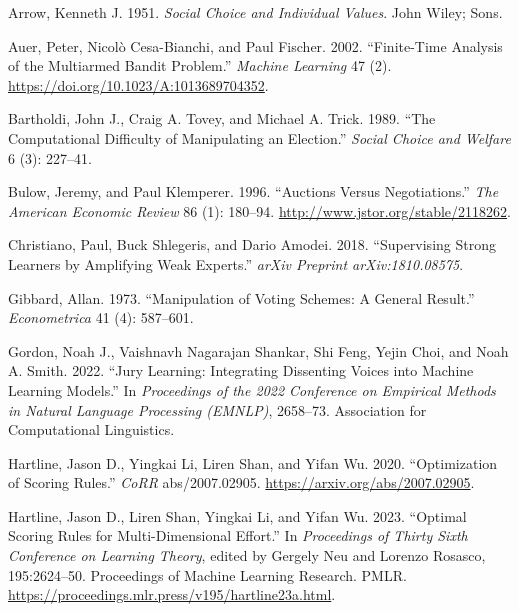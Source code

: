 \documentclass[
  letterpaper,
  numbers=noenddot,
  DIV=11]{scrreprt}
\newlength{\cslhangindent}
\newenvironment{CSLReferences}[2] %
 {\begin{list}{}{%
  \setlength{\itemindent}{0pt}
  \setlength{\leftmargin}{0pt}
  \setlength{\parsep}{0pt}
  \ifodd #1
   \setlength{\leftmargin}{\cslhangindent}
   \setlength{\itemindent}{-1\cslhangindent}
  \fi
  \setlength{\itemsep}{#2\baselineskip}}}
 {\end{list}}
\theoremstyle{plain}
\theoremstyle{definition}
\theoremstyle{remark}
\begin{document}
\label{refs-6}
\begin{CSLReferences}{1}{0}
Arrow, Kenneth J. 1951. \emph{Social Choice and Individual Values}. John
Wiley; Sons.

Auer, Peter, Nicolò Cesa-Bianchi, and Paul Fischer. 2002. {``Finite-Time
Analysis of the Multiarmed Bandit Problem.''} \emph{Machine Learning} 47
(2). \url{https://doi.org/10.1023/A:1013689704352}.

Bartholdi, John J., Craig A. Tovey, and Michael A. Trick. 1989. {``The
Computational Difficulty of Manipulating an Election.''} \emph{Social
Choice and Welfare} 6 (3): 227--41.

Bulow, Jeremy, and Paul Klemperer. 1996. {``Auctions Versus
Negotiations.''} \emph{The American Economic Review} 86 (1): 180--94.
\url{http://www.jstor.org/stable/2118262}.

Christiano, Paul, Buck Shlegeris, and Dario Amodei. 2018. {``Supervising
Strong Learners by Amplifying Weak Experts.''} \emph{arXiv Preprint
arXiv:1810.08575}.

Gibbard, Allan. 1973. {``Manipulation of Voting Schemes: A General
Result.''} \emph{Econometrica} 41 (4): 587--601.

Gordon, Noah J., Vaishnavh Nagarajan Shankar, Shi Feng, Yejin Choi, and
Noah A. Smith. 2022. {``Jury Learning: Integrating Dissenting Voices
into Machine Learning Models.''} In \emph{Proceedings of the 2022
Conference on Empirical Methods in Natural Language Processing (EMNLP)},
2658--73. Association for Computational Linguistics.

Hartline, Jason D., Yingkai Li, Liren Shan, and Yifan Wu. 2020.
{``Optimization of Scoring Rules.''} \emph{CoRR} abs/2007.02905.
\url{https://arxiv.org/abs/2007.02905}.

Hartline, Jason D., Liren Shan, Yingkai Li, and Yifan Wu. 2023.
{``Optimal Scoring Rules for Multi-Dimensional Effort.''} In
\emph{Proceedings of Thirty Sixth Conference on Learning Theory}, edited
by Gergely Neu and Lorenzo Rosasco, 195:2624--50. Proceedings of Machine
Learning Research. PMLR.
\url{https://proceedings.mlr.press/v195/hartline23a.html}.


\end{CSLReferences}
\end{document}

